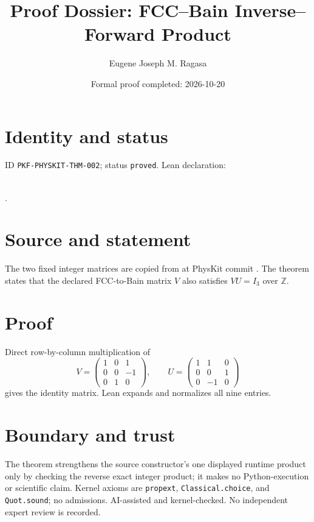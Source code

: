 \documentclass[11pt]{article}
\title{Proof Dossier: FCC--Bain Inverse--Forward Product}\author{Eugene Joseph M. Ragasa}\date{Formal proof completed: 2026-10-20}
\begin{document}
\maketitle
\section{Identity and status}
ID \texttt{PKF-PHYSKIT-THM-002}; status \texttt{proved}. Lean declaration:
\par{}\\
{\tiny{}}.
\section{Source and statement}
{\raggedright
The two fixed integer matrices are copied from
 at PhysKit commit
. The theorem states that the declared
FCC-to-Bain matrix $V$ also satisfies $VU=I_3$ over $\mathbb Z$.\par}
\section{Proof}
Direct row-by-column multiplication of
\[
V=\begin{pmatrix}1&0&1\\0&0&-1\\0&1&0\end{pmatrix},\qquad
U=\begin{pmatrix}1&1&0\\0&0&1\\0&-1&0\end{pmatrix}
\]
gives the identity matrix. Lean expands and normalizes all nine entries.
\section{Boundary and trust}
The theorem strengthens the source constructor's one displayed runtime product only by
checking the reverse exact integer product; it makes no Python-execution or scientific
claim. Kernel axioms are \texttt{propext}, \texttt{Classical.choice}, and
\texttt{Quot.sound}; no admissions. AI-assisted and kernel-checked. No independent expert
review is recorded.
\end{document}
